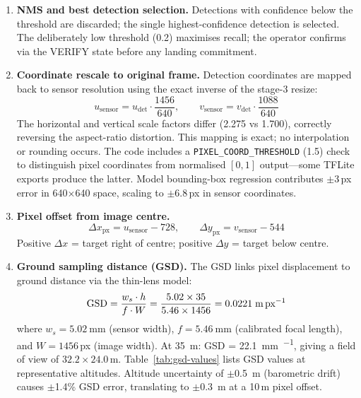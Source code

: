 \documentclass[10pt,a4paper]{article}
\begin{document}
\begin{enumerate}[resume]
  \item \textbf{NMS and best detection selection.}  Detections with confidence below the threshold are discarded; the single highest-confidence detection is selected.  The deliberately low threshold (0.2) maximises recall; the operator confirms via the VERIFY state before any landing commitment.

  \item \textbf{Coordinate rescale to original frame.} Detection coordinates are mapped back to sensor resolution using the exact inverse of the stage-3 resize:
  \begin{equation}\label{eq:coord-recovery}
    u_\mathrm{sensor} = u_\mathrm{det} \cdot \frac{1456}{640}, \qquad
    v_\mathrm{sensor} = v_\mathrm{det} \cdot \frac{1088}{640}
  \end{equation}
  The horizontal and vertical scale factors differ (2.275 vs 1.700), correctly reversing the aspect-ratio distortion.  This mapping is exact; no interpolation or rounding occurs.  The code includes a \texttt{PIXEL\_COORD\_THRESHOLD} (1.5) check to distinguish pixel coordinates from normalised $[0,1]$ output---some TFLite exports produce the latter.  Model bounding-box regression contributes $\pm$3\,px error in 640$\times$640 space, scaling to $\pm$6.8\,px in sensor coordinates.

  \item \textbf{Pixel offset from image centre.}
  \begin{equation}
    \Delta x_\mathrm{px} = u_\mathrm{sensor} - 728, \qquad
    \Delta y_\mathrm{px} = v_\mathrm{sensor} - 544
  \end{equation}
  Positive $\Delta x$ = target right of centre; positive $\Delta y$ = target below centre.

  \item \textbf{Ground sampling distance (GSD).} The GSD links pixel displacement to ground distance via the thin-lens model:
  \begin{equation}\label{eq:gsd}
    \mathrm{GSD} = \frac{w_s \cdot h}{f \cdot W} = \frac{5.02 \times 35}{5.46 \times 1456} = 0.0221 \;\text{m\,px}^{-1}
  \end{equation}
  where $w_s = \SI{5.02}{\milli\metre}$ (sensor width), $f = \SI{5.46}{\milli\metre}$ (calibrated focal length), and $W = 1456$\,px (image width).  At \SI{35}{\metre}: GSD = \SI{22.1}{\milli\metre\per\px}, giving a field of view of $32.2 \times 24.0$\,m.  Table~\ref{tab:gsd-values} lists GSD values at representative altitudes.  Altitude uncertainty of $\pm$\SI{0.5}{\metre} (barometric drift) causes $\pm$1.4\% GSD error, translating to $\pm$\SI{0.3}{\metre} at a 10\,m pixel offset.


\end{enumerate}
\end{document}
